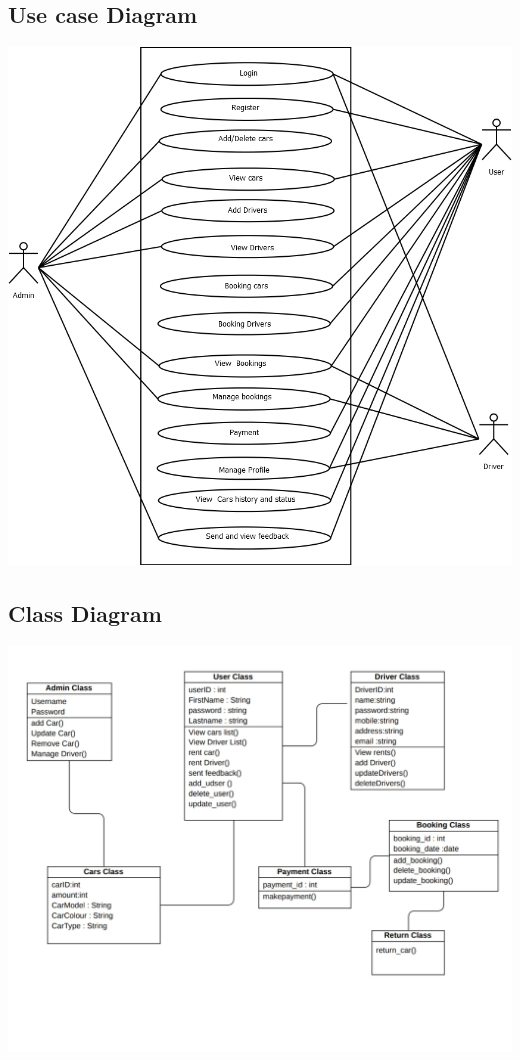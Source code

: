 \documentclass[a4paper,12pt,toc=flat]{report}
\begin{document}
        	\subsection{Use case Diagram}
        	\vspace{10mm}
        	\includegraphics[width=16cm]{usecase.png}
        	\pagebreak
        	
        	\subsection{Class Diagram}
        	\includegraphics[width=14cm]{class.jpg}
        	
\end{document}
